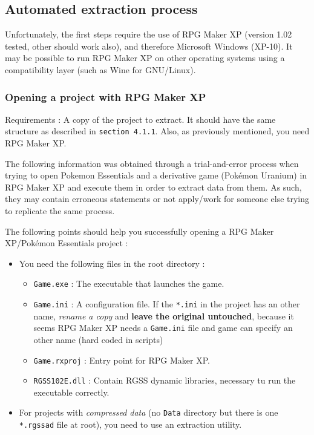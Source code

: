 \documentclass[11pt]{article}
\begin{document}
{\subsection{Automated extraction process}

Unfortunately, the first steps require the use of RPG Maker XP (version 1.02 tested, other should work also), and therefore Microsoft Windows (XP-10). It may be possible to run RPG Maker XP on other operating systems using a compatibility layer (such as Wine for GNU/Linux).


\subsubsection{Opening a project with RPG Maker XP}

Requirements : A copy of the project to extract. It should have the same structure as described in \verb|section 4.1.1|. Also, as previously mentioned, you need RPG Maker XP.

The following information was obtained through a trial-and-error process when trying to open Pokemon Essentials and a derivative game (Pokémon Uranium) in RPG Maker XP and execute them in order to extract data from them. As such, they may contain erroneous statements or not apply/work for someone else trying to replicate the same process.

The following points should help you successfully opening a RPG Maker XP/Pokémon Essentials project :

\begin{itemize}
	\item You need the following files in the root directory :
	
	\begin{itemize}
		\item \verb|Game.exe| : The executable that launches the game.
		\item \verb|Game.ini| : A configuration file. If the \verb|*.ini| in the project has an other name, \textit{rename a copy} and \textbf{leave the original untouched}, because it seems RPG Maker XP needs a \verb|Game.ini| file and game can specify an other name (hard coded in scripts)
		\item \verb|Game.rxproj| : Entry point for RPG Maker XP.
		\item \verb|RGSS102E.dll| : Contain RGSS dynamic libraries, necessary tu run the executable correctly.
	\end{itemize}
	
	\item For projects with \textit{compressed data} (no \verb|Data| directory but there is one \verb|*.rgssad| file at root), you need to use an extraction utility.
	

\end{itemize}}
\end{document}
